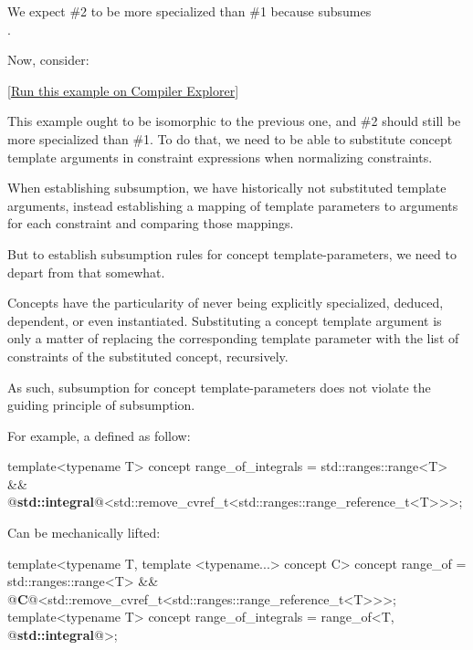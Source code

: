 \documentclass{wg21}
\begin{document}
We expect \#2 to be more specialized than \#1 because  subsumes\\
.

Now, consider:


[\href{https://compiler-explorer.com/z/71qjW1WWP}{Run this example on Compiler Explorer}]

This example ought to be isomorphic to the previous one, and \#2 should still be more specialized than \#1.
To do that, we need to be able to substitute concept template arguments in constraint expressions when normalizing constraints.

When establishing subsumption, we have historically not substituted template arguments, instead establishing a mapping of template parameters to arguments for each
constraint and comparing those mappings.

But to establish subsumption rules for concept template-parameters, we need to depart from that somewhat.

Concepts have the particularity of never being explicitly specialized, deduced, dependent, or even instantiated.
Substituting a concept template argument is only a matter of replacing the corresponding template parameter with the list of constraints of the substituted
concept, recursively.

As such, subsumption for concept template-parameters does not violate the guiding principle of subsumption.

For example, a  defined as follow:

\begin{colorblock}
template<typename T>
concept range_of_integrals = std::ranges::range<T> && @\textbf{std::integral}@<std::remove_cvref_t<std::ranges::range_reference_t<T>>>;
\end{colorblock}

Can be mechanically lifted:

\begin{colorblock}
template<typename T, template <typename...> concept C>
concept range_of = std::ranges::range<T> && @\textbf{C}@<std::remove_cvref_t<std::ranges::range_reference_t<T>>>;
template<typename T>
concept range_of_integrals = range_of<T, @\textbf{std::integral}@>;
\end{colorblock}
\end{document}
